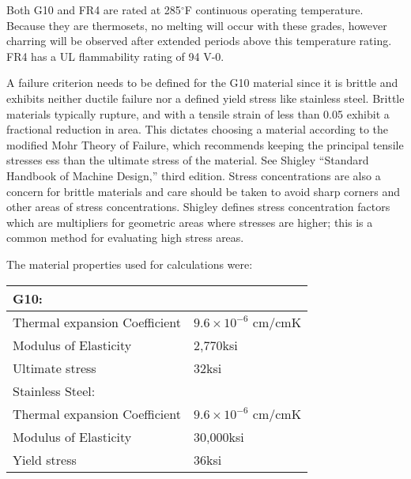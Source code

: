 Both G10 and FR4 are rated at 285$^\circ$F continuous operating temperature. Because they are thermosets, no melting will occur with these grades, however charring will be observed after extended periods above this temperature rating. FR4 has a UL flammability rating of 94 V-0.


A failure criterion needs to be defined for the G10 material since it is brittle and exhibits neither ductile failure nor a defined yield stress like stainless steel.  Brittle materials typically rupture, and with a tensile strain of less than 0.05 exhibit a fractional reduction in area.  This dictates choosing a material according to 
the modified Mohr Theory of Failure, which recommends keeping the principal tensile stresses ess than the ultimate stress of the material.  See Shigley ``Standard Handbook of Machine Design,'' third edition.   Stress concentrations are also a concern for brittle materials and care should be taken to avoid sharp corners and other areas of stress concentrations.  Shigley defines stress concentration factors which are multipliers for geometric areas where stresses are higher; this is a common method for evaluating high stress areas.  


The material properties used for calculations were:

\begin{tabular}{l l}
G10: 	& \\
\hline
Thermal expansion Coefficient	&	$9.6 \times 10^{-6}$ cm/cmK	\\
Modulus of Elasticity			&	2,770ksi				\\
\vspace{0.5em}Ultimate stress				&	32ksi				\\
Stainless Steel: & \\
\hline
Thermal expansion Coefficient	&	$9.6 \times 10^{-6}$ cm/cmK	\\
Modulus of Elasticity			&	30,000ksi				\\
Yield stress					&	36ksi				\\
\end{tabular}


